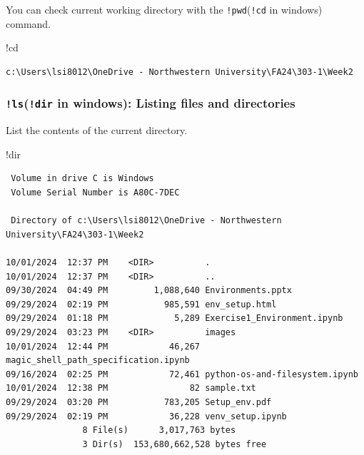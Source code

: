 \documentclass[
  letterpaper,
  DIV=11,
  numbers=noendperiod]{scrreprt}
\newenvironment{Shaded}{\begin{snugshade}}{\end{snugshade}}
\newcommand{\BuiltInTok}[1]{\textcolor[rgb]{0.00,0.23,0.31}{#1}}
\newcommand{\NormalTok}[1]{\textcolor[rgb]{0.00,0.23,0.31}{#1}}
\newcommand{\OperatorTok}[1]{\textcolor[rgb]{0.37,0.37,0.37}{#1}}
\begin{document}
You can check current working directory with the
\texttt{!pwd}(\texttt{!cd} in windows) command.

\begin{Shaded}
\begin{Highlighting}[]
\OperatorTok{!}\NormalTok{cd}
\end{Highlighting}
\end{Shaded}

\begin{verbatim}
c:\Users\lsi8012\OneDrive - Northwestern University\FA24\303-1\Week2
\end{verbatim}

\hypertarget{lsdir-in-windows-listing-files-and-directories}{%
\subsubsection{\texorpdfstring{\texttt{!ls}(\texttt{!dir} in windows):
Listing files and
directories}{!ls(!dir in windows): Listing files and directories}}\label{lsdir-in-windows-listing-files-and-directories}}

List the contents of the current directory.

\begin{Shaded}
\begin{Highlighting}[]
\OperatorTok{!}\BuiltInTok{dir}
\end{Highlighting}
\end{Shaded}

\begin{verbatim}
 Volume in drive C is Windows
 Volume Serial Number is A80C-7DEC

 Directory of c:\Users\lsi8012\OneDrive - Northwestern University\FA24\303-1\Week2

10/01/2024  12:37 PM    <DIR>          .
10/01/2024  12:37 PM    <DIR>          ..
09/30/2024  04:49 PM         1,088,640 Environments.pptx
09/29/2024  02:19 PM           985,591 env_setup.html
09/29/2024  01:18 PM             5,289 Exercise1_Environment.ipynb
09/29/2024  03:23 PM    <DIR>          images
10/01/2024  12:44 PM            46,267 magic_shell_path_specification.ipynb
09/16/2024  02:25 PM            72,461 python-os-and-filesystem.ipynb
10/01/2024  12:38 PM                82 sample.txt
09/29/2024  03:20 PM           783,205 Setup_env.pdf
09/29/2024  02:19 PM            36,228 venv_setup.ipynb
               8 File(s)      3,017,763 bytes
               3 Dir(s)  153,680,662,528 bytes free
\end{verbatim}
\end{document}
